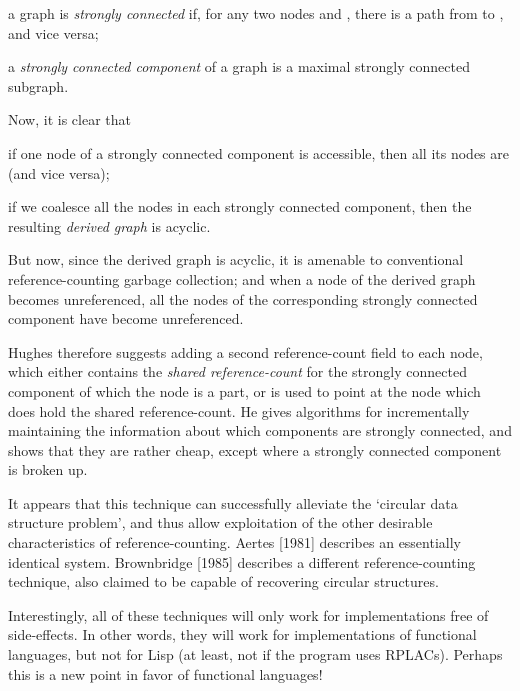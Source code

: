     \begin{numbered}
    \item a graph is \textit{strongly connected} if, for any two nodes  and , there is a path
    from  to , and vice versa;

    \item a \textit{strongly connected component} of a graph is a maximal strongly
    connected subgraph.
    \end{numbered}

    \noindent
    Now, it is clear that

    \begin{numbered}
    \item if one node of a strongly connected component is accessible, then all its
    nodes are (and vice versa);

    \item if we coalesce all the nodes in each strongly connected component, then
    the resulting \textit{derived graph} is acyclic.
    \end{numbered}

    \noindent
    But now, since the derived graph is acyclic, it is amenable to conventional
    reference-counting garbage collection; and when a node of the derived graph
    becomes unreferenced, all the nodes of the corresponding strongly connected
    component have become unreferenced.

    Hughes therefore suggests adding a second reference-count field to each
    node, which either contains the \textit{shared reference-count} for the strongly
    connected component of which the node is a part, or is used to point at the
    node which does hold the shared reference-count. He gives algorithms for
    incrementally maintaining the information about which components are
    strongly connected, and shows that they are rather cheap, except where a
    strongly connected component is broken up.

    It appears that this technique can successfully alleviate the `circular data
    structure problem', and thus allow exploitation of the other desirable
    characteristics of reference-counting. Aertes [1981] describes an essentially
    identical system. Brownbridge [1985] describes a different reference-counting technique, also claimed to be capable of recovering circular
    structures.

    Interestingly, all of these techniques will only work for implementations
    free of side-effects. In other words, they will work for implementations of
    functional languages, but not for Lisp (at least, not if the program uses
    RPLACs). Perhaps this is a new point in favor of functional languages!

